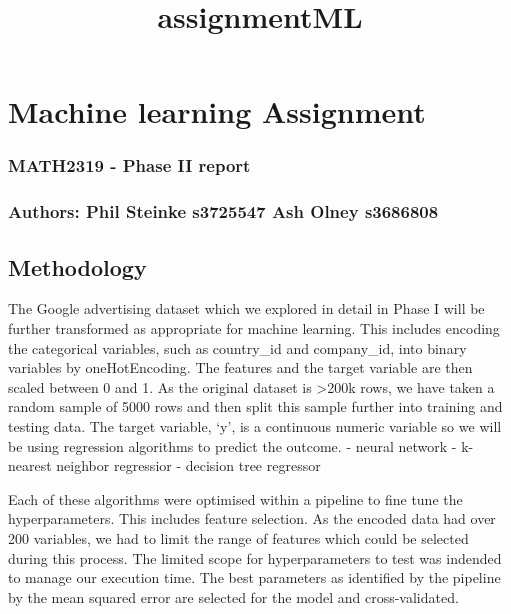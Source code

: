 \documentclass[11pt]{article}
\title{assignmentML}
\begin{document}
    
    
    \maketitle
    
    

    
    \hypertarget{machine-learning-assignment}{%
\section{Machine learning
Assignment}\label{machine-learning-assignment}}

\hypertarget{math2319---phase-ii-report}{%
\subsubsection{MATH2319 - Phase II
report}\label{math2319---phase-ii-report}}

\hypertarget{authors-phil-steinke-s3725547-ash-olney-s3686808}{%
\subsubsection{Authors: Phil Steinke s3725547 Ash Olney
s3686808}\label{authors-phil-steinke-s3725547-ash-olney-s3686808}}

    \hypertarget{methodology}{%
\subsection{Methodology}\label{methodology}}

The Google advertising dataset which we explored in detail in Phase I
will be further transformed as appropriate for machine learning. This
includes encoding the categorical variables, such as country\_id and
company\_id, into binary variables by oneHotEncoding. The features and
the target variable are then scaled between 0 and 1. As the original
dataset is \textgreater200k rows, we have taken a random sample of 5000
rows and then split this sample further into training and testing data.
The target variable, `y', is a continuous numeric variable so we will be
using regression algorithms to predict the outcome. - neural network -
k-nearest neighbor regressior - decision tree regressor

Each of these algorithms were optimised within a pipeline to fine tune
the hyperparameters. This includes feature selection. As the encoded
data had over 200 variables, we had to limit the range of features which
could be selected during this process. The limited scope for
hyperparameters to test was indended to manage our execution time. The
best parameters as identified by the pipeline by the mean squared error
are selected for the model and cross-validated.
\end{document}
